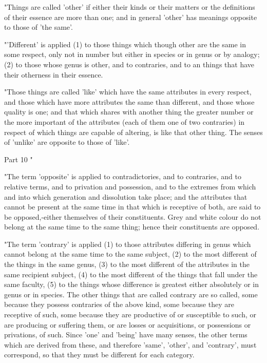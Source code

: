 "Things are called 'other' if either their kinds or their matters
or the definitions of their essence are more than one; and in general
'other' has meanings opposite to those of 'the same'. 

"'Different' is applied (1) to those things which though other are
the same in some respect, only not in number but either in species
or in genus or by analogy; (2) to those whose genus is other, and
to contraries, and to an things that have their otherness in their
essence. 

"Those things are called 'like' which have the same attributes in
every respect, and those which have more attributes the same than
different, and those whose quality is one; and that which shares with
another thing the greater number or the more important of the attributes
(each of them one of two contraries) in respect of which things are
capable of altering, is like that other thing. The senses of 'unlike'
are opposite to those of 'like'. 

Part 10 "

"The term 'opposite' is applied to contradictories, and to contraries,
and to relative terms, and to privation and possession, and to the
extremes from which and into which generation and dissolution take
place; and the attributes that cannot be present at the same time
in that which is receptive of both, are said to be opposed,-either
themselves of their constituents. Grey and white colour do not belong
at the same time to the same thing; hence their constituents are opposed.

"The term 'contrary' is applied (1) to those attributes differing
in genus which cannot belong at the same time to the same subject,
(2) to the most different of the things in the same genus, (3) to
the most different of the attributes in the same recipient subject,
(4) to the most different of the things that fall under the same faculty,
(5) to the things whose difference is greatest either absolutely or
in genus or in species. The other things that are called contrary
are so called, some because they possess contraries of the above kind,
some because they are receptive of such, some because they are productive
of or susceptible to such, or are producing or suffering them, or
are losses or acquisitions, or possessions or privations, of such.
Since 'one' and 'being' have many senses, the other terms which are
derived from these, and therefore 'same', 'other', and 'contrary',
must correspond, so that they must be different for each category.

